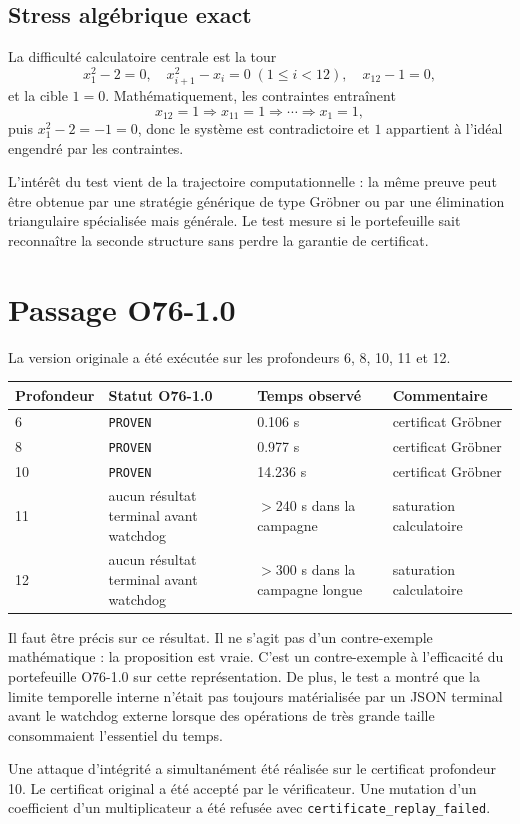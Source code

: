 \documentclass[11pt,a4paper]{article}
\newcommand{\Proven}{\texttt{PROVEN}}
\begin{document}
\subsection{Stress algébrique exact}
La difficulté calculatoire centrale est la tour
\[
x_1^2-2=0,
\quad x_{i+1}^2-x_i=0\; (1\le i<12),
\quad x_{12}-1=0,
\]
et la cible $1=0$. Mathématiquement, les contraintes entraînent
\[
x_{12}=1\Rightarrow x_{11}=1\Rightarrow\cdots\Rightarrow x_1=1,
\]
puis $x_1^2-2=-1=0$, donc le système est contradictoire et $1$ appartient à l'idéal engendré par les contraintes.

L'intérêt du test vient de la trajectoire computationnelle : la même preuve peut être obtenue par une stratégie générique de type Gröbner ou par une élimination triangulaire spécialisée mais générale. Le test mesure si le portefeuille sait reconnaître la seconde structure sans perdre la garantie de certificat.

\section{Passage O76-1.0}
La version originale a été exécutée sur les profondeurs 6, 8, 10, 11 et 12.
\begin{longtable}{p{}p{}p{}p{}}
\toprule
Profondeur & Statut O76-1.0 & Temps observé & Commentaire\\
\midrule
6 & \Proven{} & 0.106 s & certificat Gröbner\\
8 & \Proven{} & 0.977 s & certificat Gröbner\\
10 & \Proven{} & 14.236 s & certificat Gröbner\\
11 & aucun résultat terminal avant watchdog & $>$240 s dans la campagne & saturation calculatoire\\
12 & aucun résultat terminal avant watchdog & $>$300 s dans la campagne longue & saturation calculatoire\\
\bottomrule
\end{longtable}

Il faut être précis sur ce résultat. Il ne s'agit pas d'un contre-exemple mathématique : la proposition est vraie. C'est un contre-exemple à l'efficacité du portefeuille O76-1.0 sur cette représentation. De plus, le test a montré que la limite temporelle interne n'était pas toujours matérialisée par un JSON terminal avant le watchdog externe lorsque des opérations de très grande taille consommaient l'essentiel du temps.

Une attaque d'intégrité a simultanément été réalisée sur le certificat profondeur 10. Le certificat original a été accepté par le vérificateur. Une mutation d'un coefficient d'un multiplicateur a été refusée avec \texttt{certificate\_replay\_failed}.
\end{document}
